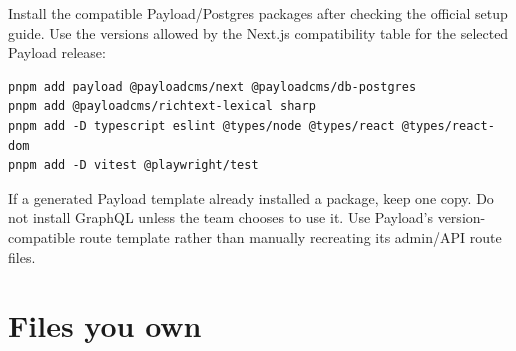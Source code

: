 \documentclass[11pt]{article}
\begin{document}
Install the compatible Payload/Postgres packages after checking the official setup guide. Use the versions allowed by the Next.js compatibility table for the selected Payload release:
\begin{verbatim}
pnpm add payload @payloadcms/next @payloadcms/db-postgres
pnpm add @payloadcms/richtext-lexical sharp
pnpm add -D typescript eslint @types/node @types/react @types/react-dom
pnpm add -D vitest @playwright/test
\end{verbatim}
If a generated Payload template already installed a package, keep one copy. Do not install GraphQL unless the team chooses to use it. Use Payload's version-compatible route template rather than manually recreating its admin/API route files.

\section{Files you own}
\end{document}
